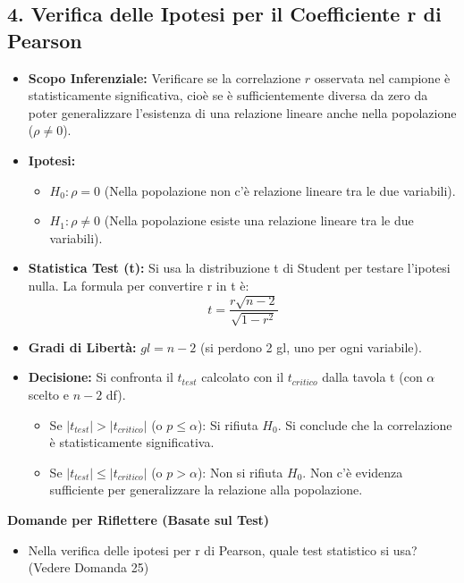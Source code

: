 \documentclass[12pt, a4paper]{article}
\newenvironment{reflectionbox}{%
    \medskip
    \begin{framed}\par\noindent
    \textbf{\color{boxtitlecolor}Domande per Riflettere (Basate sul Test)} \par
    \begin{itemize}[leftmargin=*, label=$\blacktriangleright$]
}{%
    \end{itemize}\par
    \end{framed}
    \medskip
}
\newcommand{\alphaerr}{\alpha} %
\newcommand{\Hnull}{H_0} %
\newcommand{\Halt}{H_1} %
\newcommand{\df}{gl} %
\newcommand{\rpearson}{r} %
\newcommand{\poprho}{\rho} %
\newcommand{\rsq}{r^2} %
\begin{document}
\subsection*{4. Verifica delle Ipotesi per il Coefficiente r di Pearson}
\begin{itemize}
    \item \textbf{Scopo Inferenziale:} Verificare se la correlazione $\rpearson$ osservata nel campione è statisticamente significativa, cioè se è sufficientemente diversa da zero da poter generalizzare l'esistenza di una relazione lineare anche nella popolazione ($\poprho \neq 0$).
    \item \textbf{Ipotesi:}
        \begin{itemize}
            \item $\Hnull: \poprho = 0$ (Nella popolazione non c'è relazione lineare tra le due variabili).
            \item $\Halt: \poprho \neq 0$ (Nella popolazione esiste una relazione lineare tra le due variabili).
        \end{itemize}
    \item \textbf{Statistica Test (t):} Si usa la distribuzione t di Student per testare l'ipotesi nulla. La formula per convertire r in t è:
      $$ t = \frac{\rpearson \sqrt{n-2}}{\sqrt{1-\rsq}} $$
    \item \textbf{Gradi di Libertà:} $\df = n - 2$ (si perdono 2 gl, uno per ogni variabile).
    \item \textbf{Decisione:} Si confronta il $t_{test}$ calcolato con il $t_{critico}$ dalla tavola t (con $\alphaerr$ scelto e $n-2$ df).
        \begin{itemize}
            \item Se $|t_{test}| > |t_{critico}|$ (o $p \le \alphaerr$): Si rifiuta $\Hnull$. Si conclude che la correlazione è statisticamente significativa.
            \item Se $|t_{test}| \le |t_{critico}|$ (o $p > \alphaerr$): Non si rifiuta $\Hnull$. Non c'è evidenza sufficiente per generalizzare la relazione alla popolazione.
        \end{itemize}
\end{itemize}

\begin{reflectionbox}
    \item Nella verifica delle ipotesi per r di Pearson, quale test statistico si usa? (Vedere Domanda 25)
\end{reflectionbox}
\end{document}
